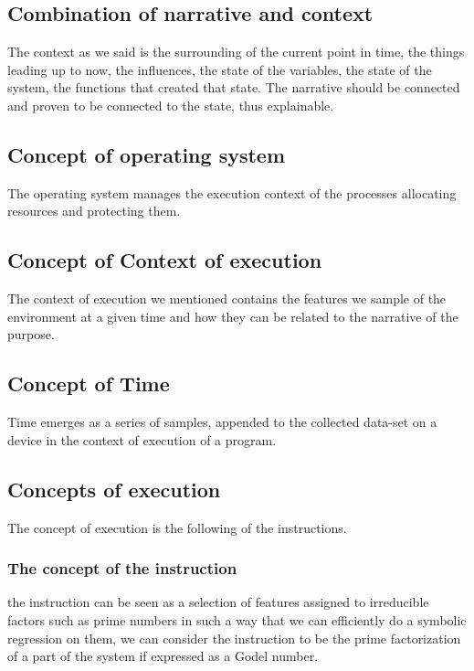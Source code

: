 \documentclass{article}
\begin{document}
\subsection{Combination of narrative and context}

The context as we said is the surrounding of the current point in time,
the things leading up to now, the influences, the state of the  variables,
the state of the system, the functions that created that state. The narrative should be connected and proven to be connected to the state, thus explainable.

\subsection{Concept of operating system}
The operating system manages the execution context of the processes
allocating resources and protecting them.

\subsection{Concept of Context of execution}

The context of execution we mentioned contains the features we sample of the
environment at a given time and how they can be related to the narrative of the purpose.

\subsection{Concept of Time}

Time emerges as a series of samples, appended to the collected data-set
on a device in the context of execution of a program.

\subsection{Concepts of execution}
The concept of execution is the following of
the instructions.

\subsubsection{The concept of the instruction}
the instruction can be seen as a selection of features assigned to irreducible factors such as prime numbers in such a way that we can efficiently do a symbolic regression on them, we can consider the instruction to be the prime factorization of a part of the system if expressed as a Godel number.
\end{document}
